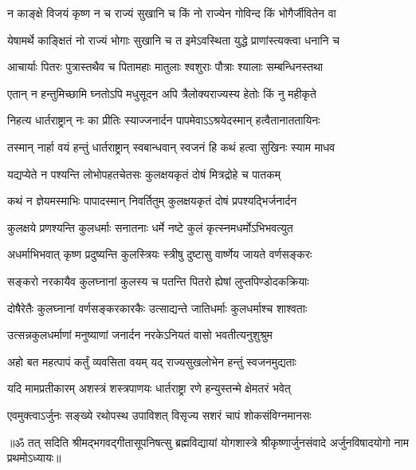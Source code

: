 \twolineshloka
{न काङ्क्षे विजयं कृष्ण न च राज्यं सुखानि च}
{किं नो राज्येन गोविन्द किं भोगैर्जीवितेन वा}%

\twolineshloka
{येषामर्थे काङ्क्षितं नो राज्यं भोगाः सुखानि च}
{त इमेऽवस्थिता युद्धे प्राणांस्त्यक्त्वा धनानि च}%

\twolineshloka
{आचार्याः पितरः पुत्रास्तथैव च पितामहाः}
{मातुलाः श्वशुराः पौत्राः श्यालाः सम्बन्धिनस्तथा}%

\twolineshloka
{एतान् न हन्तुमिच्छामि घ्नतोऽपि मधुसूदन}
{अपि त्रैलोक्यराज्यस्य हेतोः किं नु महीकृते}%

\twolineshloka
{निहत्य धार्तराष्ट्रान् नः का प्रीतिः स्याज्जनार्दन}
{पापमेवाऽऽश्रयेदस्मान् हत्वैतानाततायिनः}%

\twolineshloka
{तस्मान् नार्हा वयं हन्तुं धार्तराष्ट्रान् स्वबान्धवान्}
{स्वजनं हि कथं हत्वा सुखिनः स्याम माधव}%

\twolineshloka
{यद्यप्येते न पश्यन्ति लोभोपहतचेतसः}
{कुलक्षयकृतं दोषं मित्रद्रोहे च पातकम्}%

\twolineshloka
{कथं न ज्ञेयमस्माभिः पापादस्मान् निवर्तितुम्}
{कुलक्षयकृतं दोषं प्रपश्यद्भिर्जनार्दन}%

\twolineshloka
{कुलक्षये प्रणश्यन्ति कुलधर्माः सनातनाः}
{धर्मे नष्टे कुलं कृत्स्नमधर्मोऽभिभवत्युत}%

\twolineshloka
{अधर्माभिभवात् कृष्ण प्रदुष्यन्ति कुलस्त्रियः}
{स्त्रीषु दुष्टासु वार्ष्णेय जायते वर्णसङ्करः}%

\twolineshloka
{सङ्करो नरकायैव कुलघ्नानां कुलस्य च}
{पतन्ति पितरो ह्येषां लुप्तपिण्डोदकक्रियाः}%

\twolineshloka
{दोषैरेतैः कुलघ्नानां वर्णसङ्करकारकैः}
{उत्साद्यन्ते जातिधर्माः कुलधर्माश्च शाश्वताः}%

\twolineshloka
{उत्सन्नकुलधर्माणां मनुष्याणां जनार्दन}
{नरकेऽनियतं वासो भवतीत्यनुशुश्रुम}%

\twolineshloka
{अहो बत महत्पापं कर्तुं व्यवसिता वयम्}
{यद् राज्यसुखलोभेन हन्तुं स्वजनमुद्यताः}%

\twolineshloka
{यदि मामप्रतीकारम् अशस्त्रं शस्त्रपाणयः}
{धार्तराष्ट्रा रणे हन्युस्तन्मे क्षेमतरं भवेत्}%


\twolineshloka
{एवमुक्त्वाऽर्जुनः सङ्ख्ये रथोपस्थ उपाविशत्}
{विसृज्य सशरं चापं शोकसंविग्नमानसः}%

{॥ॐ तत् सदिति श्रीमद्भगवद्गीतासूपनिषत्सु ब्रह्मविद्यायां योगशास्त्रे श्रीकृष्णार्जुनसंवादे अर्जुनविषादयोगो नाम प्रथमोऽध्यायः॥}

